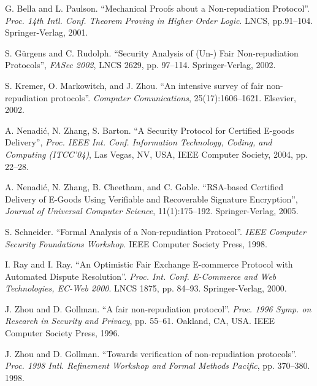 \documentclass{article}
\begin{document}
\begin{thebibliography}{99}


G. Bella and L. Paulson. ``Mechanical Proofs about a Non-repudiation
Protocol''. \textit{Proc. 14th Intl. Conf. Theorem Proving in Higher
Order Logic}. LNCS, pp.91--104. Springer-Verlag, 2001.

S. G\"urgens and C. Rudolph. ``Security Analysis of (Un-) Fair
Non-repudiation Protocols'', \textit{FASec 2002}, LNCS 2629, pp.
97--114. Springer-Verlag, 2002.

S. Kremer, O. Markowitch, and J. Zhou. ``An intensive survey of fair
non-repudiation protocols''. \textit{Computer Comunications},
25(17):1606--1621. Elsevier, 2002.

A. Nenadi\'c, N. Zhang, S. Barton. ``A Security Protocol for
Certified E-goods Delivery'', \textit{Proc. IEEE Int. Conf.
Information Technology, Coding, and Computing (ITCC'04)}, Las Vegas,
NV, USA, IEEE Computer Society, 2004, pp. 22--28.

A. Nenadi\'c, N. Zhang, B. Cheetham, and C. Goble. ``RSA-based
Certified Delivery of E-Goods Using Verifiable and Recoverable
Signature Encryption'', \textit{Journal of Universal Computer
Science}, 11(1):175--192. Springer-Verlag, 2005.

S. Schneider. ``Formal Analysis of a Non-repudiation Protocol''.
\textit{IEEE Computer Security Foundations Workshop}. IEEE Computer
Society Press, 1998.

I. Ray and I. Ray. ``An Optimistic Fair Exchange E-commerce Protocol
with Automated Dispute Resolution''. \textit{Proc. Int. Conf.
E-Commerce and Web Technologies, EC-Web 2000}. LNCS 1875, pp.
84--93. Springer-Verlag, 2000.

J. Zhou and D. Gollman. ``A fair non-repudiation protocol''.
\textit{Proc. 1996 Symp. on Research in Security and Privacy}, pp.
55--61. Oakland, CA, USA. IEEE Computer Society Press, 1996.

J. Zhou and D. Gollman. ``Towards verification of non-repudiation
protocols''. \textit{Proc. 1998 Intl. Refinement Workshop and Formal
Methods Pacific}, pp. 370--380. 1998.

\end{thebibliography}
\end{document}

